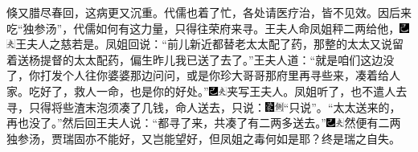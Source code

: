 倏又腊尽春回，这病更又沉重。代儒也着了忙，各处请医疗治，皆不见效。因后来吃“独参汤”，代儒如何有这力量，只得往荣府来寻。王夫人命凤姐秤二两给他，{\includegraphics[width=3mm]{../Images/00003}\includegraphics[width=3mm]{../Images/00012}\footnotesize \kaishu 王夫人之慈若是。}凤姐回说：“前儿新近都替老太太配了药，那整的太太又说留着送杨提督的太太配药，偏生昨儿我已送了去了。”王夫人道：“就是咱们这边没了，你打发个人往你婆婆那边问问，或是你珍大哥哥那府里再寻些来，凑着给人家。吃好了，救人一命，也是你的好处。”{\includegraphics[width=3mm]{../Images/00003}\includegraphics[width=3mm]{../Images/00012}\footnotesize \kaishu 夹写王夫人。}凤姐听了，也不遣人去寻，只得将些渣末泡须凑了几钱，命人送去，只说：{\includegraphics[width=3mm]{../Images/00006}\includegraphics[width=3mm]{../Images/00011}\footnotesize \kaishu “只说”。}“太太送来的，再也没了。”然后回王夫人说：“都寻了来，共凑了有二两多送去。”{\includegraphics[width=3mm]{../Images/00003}\includegraphics[width=3mm]{../Images/00012}\footnotesize \kaishu 然便有二两独参汤，贾瑞固亦不能好，又岂能望好，但凤姐之毒何如是耶？终是瑞之自失。}

